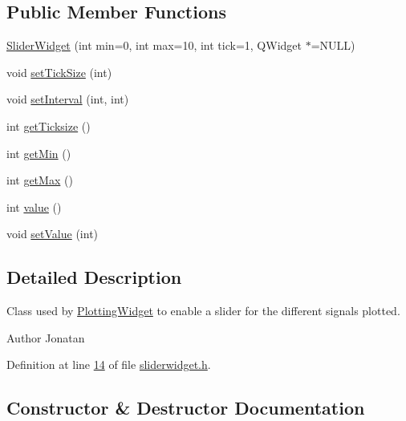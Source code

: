\subsection*{Public Member Functions}
\begin{DoxyCompactItemize}
\item 
\hyperlink{classSliderWidget_a22d7be7e513e8d74ec95fcc73d96fdf6}{Slider\+Widget} (int min=0, int max=10, int tick=1, Q\+Widget $\ast$=N\+U\+LL)
\item 
void \hyperlink{classSliderWidget_a8d5fb2c86d6dbcbe67ae480590020af6}{set\+Tick\+Size} (int)
\item 
void \hyperlink{classSliderWidget_aeb088af9a4577c8ca1e64a06bd74eaa1}{set\+Interval} (int, int)
\item 
int \hyperlink{classSliderWidget_a3aec05c05cefab0ec470f6eb79afa81b}{get\+Ticksize} ()
\item 
int \hyperlink{classSliderWidget_a6606e549b1e934517a48f68f9d29ffa6}{get\+Min} ()
\item 
int \hyperlink{classSliderWidget_acdeb4972b7a4ae90f0d042317ff2965d}{get\+Max} ()
\item 
int \hyperlink{classSliderWidget_a05ed61d5bb79a82da1f51f73b5e2466a}{value} ()
\item 
void \hyperlink{classSliderWidget_ad69dd98151b2132011341f7ae7799480}{set\+Value} (int)
\end{DoxyCompactItemize}


\subsection{Detailed Description}
Class used by \hyperlink{classPlottingWidget}{Plotting\+Widget} to enable a slider for the different signals plotted. 

\begin{DoxyAuthor}{Author}
Jonatan 
\end{DoxyAuthor}


Definition at line \hyperlink{sliderwidget_8h_source_l00014}{14} of file \hyperlink{sliderwidget_8h_source}{sliderwidget.\+h}.



\subsection{Constructor \& Destructor Documentation}
